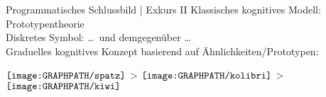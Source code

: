 \begin{frame}
  {Programmatisches Schlussbild | Exkurs II}
  \onslide<+->
  \onslide<+->
  Klassisches kognitives Modell: \alert{Prototypentheorie} \\
  \onslide<+->
  \Zeile
  \alert{Diskretes Symbol}:  \onslide<+-> \ldots\ und demgegenüber \ldots\\
  \onslide<+->
  \alert{Graduelles kognitives Konzept} basierend auf Ähnlichkeiten\slash Prototypen:\\
  \onslide<+->
  \Halbzeile
  \begin{minipage}{0.9\textwidth}
  \centering
    $\vcenter{\hbox{\texttt{[image: \\GRAPHPATH/spatz]}}}$
    \onslide<+->
    \hspace*{0.025\textwidth}>\hspace*{0.025\textwidth}
    $\vcenter{\hbox{\texttt{[image: \\GRAPHPATH/kolibri]}}}$
    \onslide<+->
    \hspace*{0.025\textwidth}>\hspace*{0.025\textwidth}
    $\vcenter{\hbox{\texttt{[image: \\GRAPHPATH/kiwi]}}}$
  \end{minipage}\\
  \Halbzeile
  \centering 
\end{frame}

